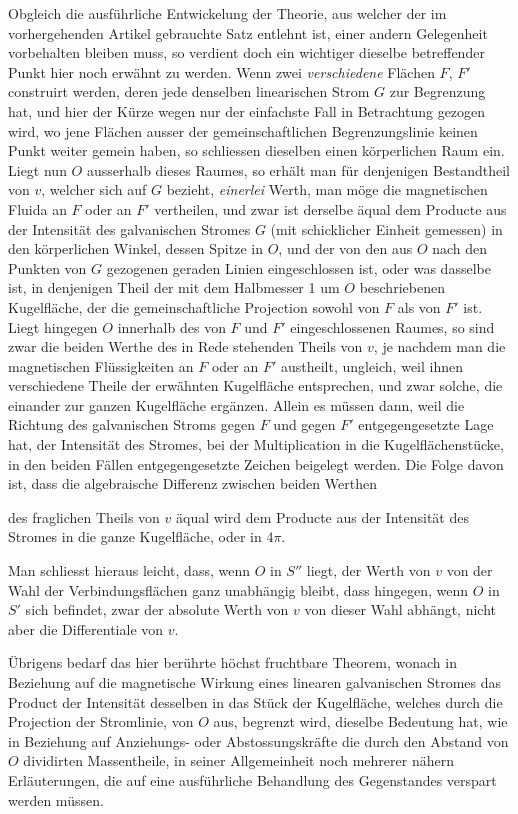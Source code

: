 Obgleich die ausführliche Entwickelung der Theorie, aus welcher der im vorhergehenden Artikel gebrauchte Satz entlehnt ist, einer andern Gelegenheit vorbehalten bleiben muss, so verdient doch ein wichtiger dieselbe betreffender Punkt hier noch erwähnt zu werden. Wenn zwei \textit{verschiedene} Flächen $F$, $F'$ construirt werden, deren jede denselben linearischen Strom $G$ zur Begrenzung hat, und hier der Kürze wegen nur der einfachste Fall in Betrachtung gezogen wird, wo jene Flächen ausser der gemeinschaftlichen Begrenzungslinie keinen Punkt weiter gemein haben, so schliessen dieselben einen körperlichen Raum ein. Liegt nun $O$ ausserhalb dieses Raumes, so erhält man für denjenigen Bestandtheil von $v$, welcher sich auf $G$ bezieht, \textit{einerlei} Werth, man möge die magnetischen Fluida an $F$ oder an $F'$ vertheilen, und zwar ist derselbe äqual dem Producte aus der Intensität des galvanischen Stromes $G$ (mit schicklicher Einheit gemessen) in den körperlichen Winkel, dessen Spitze in $O$, und der von den aus $O$ nach den Punkten von $G$ gezogenen geraden Linien eingeschlossen ist, oder was dasselbe ist, in denjenigen Theil der mit dem Halbmesser 1 um $O$ beschriebenen Kugelfläche, der die gemeinschaftliche Projection sowohl von $F$ als von $F'$ ist. Liegt hingegen $O$ innerhalb des von $F$ und $F'$ eingeschlossenen Raumes, so sind zwar die beiden Werthe des in Rede stehenden Theils von $v$, je nachdem man die magnetischen Flüssigkeiten an $F$ oder an $F'$ austheilt, ungleich, weil ihnen verschiedene Theile der erwähnten Kugelfläche entsprechen, und zwar solche, die einander zur ganzen Kugelfläche ergänzen. Allein es müssen dann, weil die Richtung des galvanischen Stroms gegen $F$ und gegen $F'$ entgegengesetzte Lage hat, der Intensität des Stromes, bei der Multiplication in die Kugelflächenstücke, in den beiden Fällen entgegengesetzte Zeichen beigelegt werden. Die Folge davon ist, dass die algebraische Differenz zwischen beiden Werthen
\par\clearpage
{}
\noindent des fraglichen Theils von $v$ äqual wird dem Producte aus der Intensität des Stromes in die ganze Kugelfläche, oder in $4\pi$.

Man schliesst hieraus leicht, dass, wenn $O$ in $S''$ liegt, der Werth von $v$ von der Wahl der Verbindungsflächen ganz unabhängig bleibt, dass hingegen, wenn $O$ in $S'$ sich befindet, zwar der absolute Werth von $v$ von dieser Wahl abhängt, nicht aber die Differentiale von $v$.

Übrigens bedarf das hier berührte höchst fruchtbare Theorem, wonach in Beziehung auf die magnetische Wirkung eines linearen galvanischen Stromes das Product der Intensität desselben in das Stück der Kugelfläche, welches durch die Projection der Stromlinie, von $O$ aus, begrenzt wird, dieselbe Bedeutung hat, wie in Beziehung auf Anziehungs- oder Abstossungskräfte die durch den Abstand von $O$ dividirten Massentheile, in seiner Allgemeinheit noch mehrerer nähern Erläuterungen, die auf eine ausführliche Behandlung des Gegenstandes verspart werden müssen.

